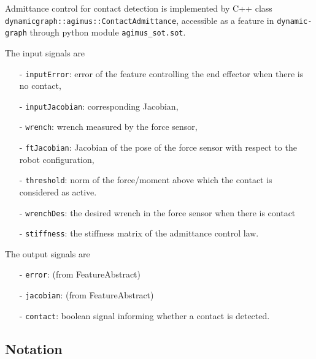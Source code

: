 \documentclass{article}
\begin{document}
Admittance control for contact detection is implemented by C++ class \\ \texttt{dynamicgraph::agimus::ContactAdmittance}, accessible as a feature in \texttt{dynamic-graph} through python module \texttt{agimus\_sot.sot}.

The input signals are
\begin{itemize}
\item[-]\texttt{inputError}: error of the feature controlling the end
  effector when there is no contact,
\item[-] \texttt{inputJacobian}: corresponding Jacobian,
\item[-] \texttt{wrench}: wrench measured by the force sensor,
\item[-] \texttt{ftJacobian}: Jacobian of the pose of the force sensor with respect to the robot configuration,
\item[-] \texttt{threshold}: norm of the force/moment above which the contact is
    considered as active.
\item[-] \texttt{wrenchDes}: the desired wrench in the force sensor when
  there is contact
\item[-] \texttt{stiffness}: the stiffness matrix of the admittance control law.
\end{itemize}

The output signals are
\begin{itemize}
\item[-] \texttt{error}: (from FeatureAbstract)
\item[-] \texttt{jacobian}: (from FeatureAbstract)
\item[-] \texttt{contact}: boolean signal informing whether a contact is detected.
\end{itemize}

\subsection{Notation}
\end{document}
